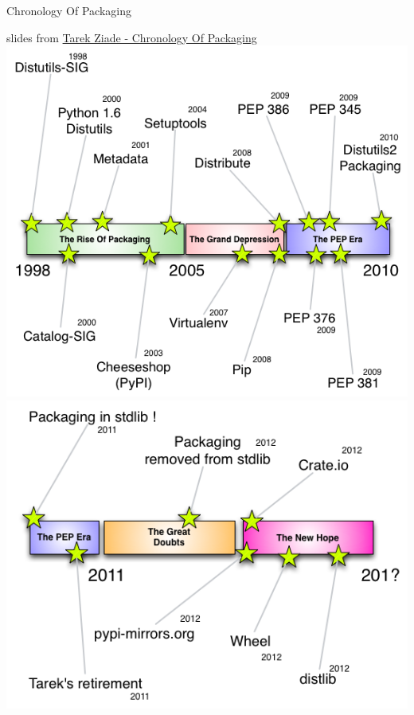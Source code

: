 \documentclass{article}
\begin{document}
\LARGE

\begin{center} Chronology Of Packaging \end{center}
    slides from \href{http://ziade.org/2012/11/17/chronology-of-packaging/}
                        {Tarek Ziade - Chronology Of Packaging}
    \includegraphics[scale=1.0]{images/packaging-history-part1.png}\\
    \includegraphics[scale=1.0]{images/packaging-history-part2.png}
\newpage
\end{document}
